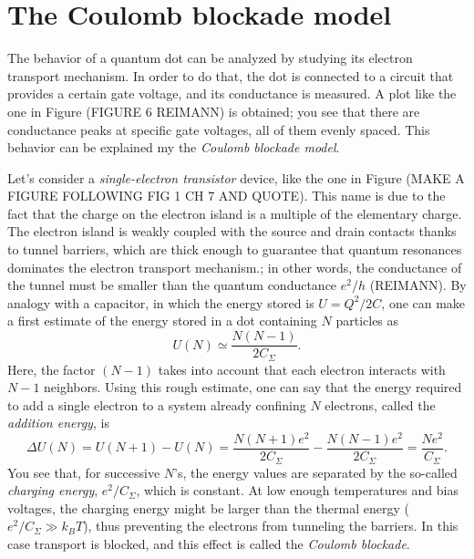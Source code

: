 \documentclass[a4paper,twoside,11pt]{book}
\begin{document}
\section{The Coulomb blockade model}
The behavior of a quantum dot can be analyzed by studying its electron transport mechanism. In order to do that, the dot is connected to a circuit that provides a certain gate voltage, and its conductance is measured. A plot like the one in Figure (FIGURE 6 REIMANN) is obtained; you see that there are conductance peaks at specific gate voltages, all of them evenly spaced. This behavior can be explained my the \emph{Coulomb blockade model}.

Let's consider a \emph{single-electron transistor} device, like the one in Figure (MAKE A FIGURE FOLLOWING FIG 1 CH 7 AND QUOTE). This name is due to the fact that the charge on the electron island is a multiple of the elementary charge. The electron island is weakly coupled with the source and drain contacts thanks to tunnel barriers, which are thick enough to guarantee that quantum resonances dominates the electron transport mechanism.; in other words, the conductance of the tunnel must be smaller than the quantum conductance $e^2/h$ (REIMANN). By analogy with a capacitor, in which the energy stored is $U=Q^2/2C$, one can make a first estimate of the energy stored in a dot containing $N$ particles as
\begin{equation}
	U(N) \simeq \frac{N(N-1)}{2C_{\Sigma}}.
\end{equation}
Here, the factor $(N-1)$ takes into account that each electron interacts with $N-1$ neighbors. Using this rough estimate, one can say that the energy required to add a single electron to a system already confining $N$ electrons, called the \emph{addition energy}, is
\begin{equation}
	\Delta U (N) = U(N+1)-U(N) = \frac{N(N+1)e^2}{2C_{\Sigma}} - \frac{N(N-1)e^2}{2C_{\Sigma}} = \frac{Ne^2}{C_{\Sigma}}.
\end{equation}
You see that, for successive $N$'s, the energy values are separated by the so-called \emph{charging energy}, $e^2/C_{\Sigma}$, which is constant. At low enough temperatures and bias voltages, the charging energy might be larger than the thermal energy ($e^2/C_{\Sigma} \gg k_BT$), thus preventing the electrons from tunneling the barriers. In this case transport is blocked, and this effect is called the \emph{Coulomb blockade}.
\end{document}
